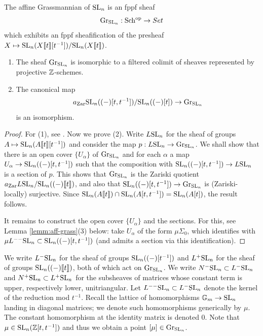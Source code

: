 \documentclass{amsart}
\numberwithin{proposition}{section}
\numberwithin{equation}{section}
\newcommand{\Gr}[1]{{\mathrm{Gr}_{#1}}}
\begin{document}
\begin{definition}
The affine Grassmannian \cite[\S2]{faltings-loop-groups} of $\mathrm{SL}_n$ is an fppf sheaf \[ \Gr{\SL_n}: \Sch^\op \to Set \] which exhibits an fppf sheafification of the presheaf $X \mapsto \mathrm{SL}_n(X\llbracket t \rrbracket[t^{-1}])/\mathrm{SL}_n(X\llbracket t \rrbracket)$.
\end{definition}

\begin{lemma}
\begin{enumerate}
\item The sheaf $\Gr{\SL_n}$ is isomorphic to a filtered colimit of sheaves represented by projective $\mathbb{Z}$-schemes.
\item The canonical map \[ a_\Zar \SL_n((\ph)[t,t^{-1}])/\SL_n((\ph)[t]) \to \Gr{\SL_n} \] is an isomorphism.
\end{enumerate}
\end{lemma}
\begin{proof}
For (1), see \cite[\S2]{faltings-loop-groups}.
Now we prove (2).
Write $L\mathrm{SL}_n$ for the sheaf of groups $A \mapsto \mathrm{SL}_n(A\llbracket t \rrbracket[t^{-1}])$ and consider the map $p: L\SL_n \to \Gr{\SL_n}$.
We shall show that there is an open cover $\{U_\alpha\}$ of $\Gr{\SL_n}$ and for each $\alpha$ a map $U_\alpha \to \mathrm{SL}_n((\mathord-)[t,t^{-1}])$ such that the composition with $\mathrm{SL}_n((\mathord-)[t,t^{-1}]) \to L\mathrm{SL}_n$ is a section of $p$.
This shows that $\Gr{\SL_n}$ is the Zariski quotient $a_{\mathrm{Zar}} L\mathrm{SL}_n/\mathrm{SL}_n((\mathord-)\llbracket t \rrbracket)$, and also that $\SL_n((\ph)[t,t^{-1}]) \to \Gr{\SL_n}$ is (Zariski-locally) surjective.
Since $\mathrm{SL}_n(A\llbracket t \rrbracket) \cap \mathrm{SL}_n(A[t,t^{-1}]) = \mathrm{SL}_n(A[t])$, the result follows.

It remains to construct the open cover $\{U_\alpha\}$ and the sections.
For this, see Lemma \ref{lemm:aff-grass}(3) below: take $U_\alpha$ of the form $\mu\Sigma_0$, which identifies with $\mu L^{--}\mathrm{SL}_n \subset \mathrm{SL}_n((\mathord-)[t,t^{-1}])$ (and admits a section via this identification).
\end{proof}

We write $L^-\mathrm{SL}_n$ for the sheaf of groups $\mathrm{SL}_n((\mathord-)[t^{-1}])$ and $L^+\mathrm{SL}_n$ for the sheaf of groups $\mathrm{SL}_n((\mathord-)\llbracket t \rrbracket)$, both of which act on $\Gr{\SL_n}$.
We write $N^-\mathrm{SL}_n \subset L^-\mathrm{SL}_n$ and $N^+ \mathrm{SL}_n \subset L^+ \mathrm{SL}_n$ for the subsheaves of matrices whose constant term is upper, respectively lower, unitriangular.
Let $L^{--}\mathrm{SL}_n \subset L^-\mathrm{SL}_n$ denote the kernel of the reduction mod $t^{-1}$.
Recall the lattice of homomorphisms ${\mathbb{G}_m} \to \mathrm{SL}_n$ landing in diagonal matrices; we denote such homomorphisms generically by $\mu$.
The constant homomorphism at the identity matrix is denoted $0$.
Note that $\mu \in \mathrm{SL}_n(\mathbb{Z}[t,t^{-1}])$ and thus we obtain a point $[\mu] \in \Gr{\SL_n}$.
\end{document}
